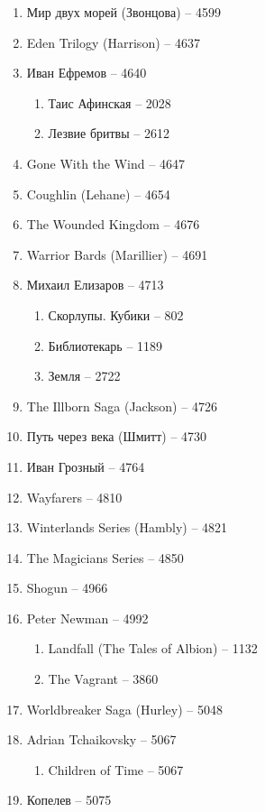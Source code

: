 \documentclass[a4paper, 11pt]{proc} %
\begin{document}
\begin{enumerate}
    \item Мир двух морей (Звонцова) -- 4599
    \item Eden Trilogy (Harrison) -- 4637
    \item Иван Ефремов -- 4640
        \begin{enumerate}
            \item Таис Афинская -- 2028
            \item Лезвие бритвы -- 2612
        \end{enumerate}
    \item Gone With the Wind -- 4647
    \item Coughlin (Lehane) -- 4654
    \item The Wounded Kingdom -- 4676
    \item Warrior Bards (Marillier) -- 4691
    \item Михаил Елизаров -- 4713
        \begin{enumerate}
            \item Скорлупы. Кубики -- 802
            \item Библиотекарь -- 1189
            \item Земля -- 2722
        \end{enumerate}
    \item The Illborn Saga (Jackson) -- 4726
    \item Путь через века (Шмитт) -- 4730
    \item Иван Грозный -- 4764
    \item Wayfarers -- 4810
    \item Winterlands Series (Hambly) -- 4821
    \item The Magicians Series -- 4850
    \item Shogun -- 4966
    \item Peter Newman -- 4992
        \begin{enumerate}
            \item Landfall (The Tales of Albion) -- 1132
            \item The Vagrant -- 3860
        \end{enumerate}
    \item Worldbreaker Saga (Hurley) -- 5048
    \item Adrian Tchaikovsky -- 5067
        \begin{enumerate}
            \item Children of Time -- 5067
        \end{enumerate}
    \item Копелев -- 5075

\end{enumerate}
\end{document}
